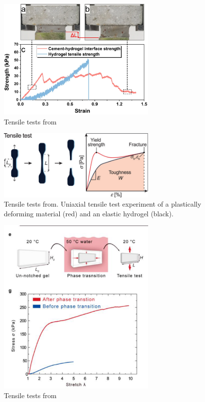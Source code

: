 \begin{figure}[ht!]
    \centering
    \includegraphics[width=0.7\textwidth]{figs/mechResponse/4.png}
    \caption{Tensile tests from\citep{chenMultilayeredCementhydrogelComposite2023}}
\end{figure}

\begin{figure}[ht!]
    \centering
    \includegraphics[width=0.7\textwidth]{figs/mechResponse/5.png}
    \caption{Tensile tests from\citep{petelinsekToughHydrogelsLoadBearing2024}. Uniaxial tensile test experiment of a plastically deforming material (red) and an elastic hydrogel (black).}
\end{figure}

\begin{figure}[ht!]
    \centering
    \includegraphics[width=0.7\textwidth]{figs/mechResponse/6.png}
    \caption{Tensile tests from\citep{kimFractureToughnessBlocking2022}}
\end{figure}

